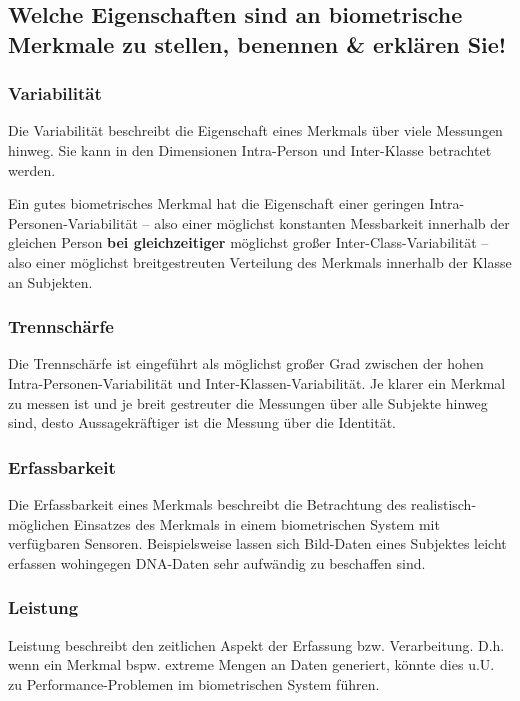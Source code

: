 \documentclass{article}
\begin{document}
\subsection{Welche Eigenschaften sind an biometrische Merkmale zu stellen, benennen \& erklären Sie!}
 
\subsubsection*{Variabilität}

Die Variabilität beschreibt die Eigenschaft eines Merkmals über viele Messungen hinweg. Sie kann in den 
Dimensionen Intra-Person und Inter-Klasse betrachtet werden.

Ein gutes biometrisches Merkmal hat die Eigenschaft einer geringen Intra-Personen-Variabilität – also 
einer möglichst konstanten Messbarkeit innerhalb der gleichen Person \textbf{bei gleichzeitiger} möglichst
großer Inter-Class-Variabilität – also einer möglichst breitgestreuten Verteilung des Merkmals innerhalb 
der Klasse an Subjekten.

\subsubsection*{Trennschärfe}

Die Trennschärfe ist eingeführt als möglichst großer Grad zwischen der hohen Intra-Personen-Variabilität 
und Inter-Klassen-Variabilität. Je klarer ein Merkmal zu messen ist und je breit gestreuter die Messungen 
über alle Subjekte hinweg sind, desto Aussagekräftiger ist die Messung über die Identität.

\subsubsection*{Erfassbarkeit}

Die Erfassbarkeit eines Merkmals beschreibt die Betrachtung des realistisch-möglichen Einsatzes des 
Merkmals in einem biometrischen System mit verfügbaren Sensoren. Beispielsweise lassen sich Bild-Daten 
eines Subjektes leicht erfassen wohingegen DNA-Daten sehr aufwändig zu beschaffen sind.

\subsubsection*{Leistung}

Leistung beschreibt den zeitlichen Aspekt der Erfassung bzw. Verarbeitung. D.h. wenn ein Merkmal bspw. 
extreme Mengen an Daten generiert, könnte dies u.U. zu Performance-Problemen im biometrischen System 
führen.
\end{document}

